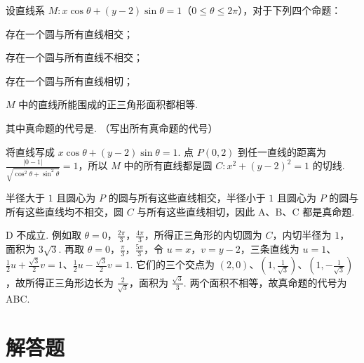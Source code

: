 \begin{problem}
设直线系 \(M: x \cos \theta + (y - 2) \sin \theta = 1\)（\(0 \leqslant \theta \leqslant 2\pi\)），对于下列四个命题：

\begin{circlelist}
\item 存在一个圆与所有直线相交；
\item 存在一个圆与所有直线不相交；
\item 存在一个圆与所有直线相切；
\item \(M\) 中的直线所能围成的正三角形面积都相等.
\end{circlelist}
其中真命题的代号是\fillinblank{}. （写出所有真命题的代号）
\begin{solution}
将直线写成 \(x\cos\theta+(y-2)\sin\theta=1\). 点 \(P(0,2)\) 到任一直线的距离为
\(\frac{|0-1|}{\sqrt{\cos^{2}\theta+\sin^{2}\theta}}=1\)，所以 \(M\) 中的所有直线都是圆 \(C:x^{2}+(y-2)^{2}=1\) 的切线.

半径大于 \(1\) 且圆心为 \(P\) 的圆与所有这些直线相交，半径小于 \(1\) 且圆心为 \(P\) 的圆与所有这些直线均不相交，圆 \(C\) 与所有这些直线相切，因此 A、B、C 都是真命题.

D 不成立. 例如取 \(\theta=0\)，\(\frac{2\pi}{3}\)，\(\frac{4\pi}{3}\)，所得正三角形的内切圆为 \(C\)，内切半径为 \(1\)，面积为 \(3\sqrt{3}\). 再取 \(\theta=0\)，\(\frac{\pi}{3}\)，\(\frac{5\pi}{3}\)，令 \(u=x\)，\(v=y-2\)，三条直线为 \(u=1\)、\(\frac12u+\frac{\sqrt3}{2}v=1\)、\(\frac12u-\frac{\sqrt3}{2}v=1\). 它们的三个交点为 \((2,0)\)、\((1,\frac1{\sqrt3})\)、\((1,-\frac1{\sqrt3})\)，故所得正三角形边长为 \(\frac{2}{\sqrt3}\)，面积为 \(\frac{\sqrt3}{3}\). 两个面积不相等，故真命题的代号为 ABC.
\end{solution}
\end{problem}

\section{解答题}

